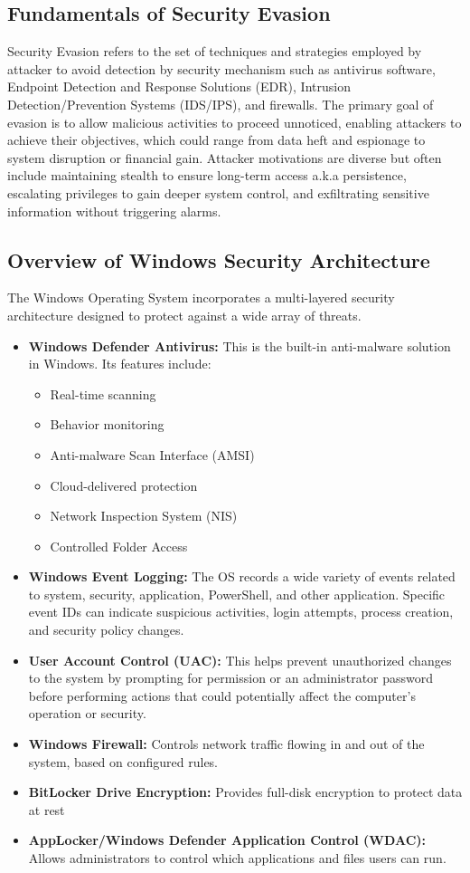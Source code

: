 \documentclass[11pt]{article}
\begin{document}
			\subsection{Fundamentals of Security Evasion}
			Security Evasion refers to the set of techniques and strategies employed by attacker to avoid detection by security mechanism such as antivirus software, Endpoint Detection and Response Solutions (EDR), Intrusion Detection/Prevention Systems (IDS/IPS), and firewalls. The primary goal of evasion is to allow malicious activities to proceed unnoticed, enabling attackers to achieve their objectives, which could range from data heft and espionage to system disruption or financial gain. Attacker motivations are diverse but often include maintaining stealth to ensure long-term access a.k.a persistence, escalating privileges to gain deeper system control, and exfiltrating sensitive information without triggering alarms.
			
			\subsection{Overview of Windows Security Architecture}
				The Windows Operating System incorporates a multi-layered security architecture designed to protect against a wide array of threats.
				\begin{itemize}
					\item \textbf{Windows Defender Antivirus:} This is the built-in anti-malware solution in Windows. Its features include:
						\begin{itemize}
							\item Real-time scanning
							\item Behavior monitoring
							\item Anti-malware Scan Interface (AMSI)
							\item Cloud-delivered protection
							\item Network Inspection System (NIS)
							\item Controlled Folder Access
						\end{itemize}
				\item \textbf{Windows Event Logging:} The OS records a wide variety of events related to system, security, application, PowerShell, and other application. Specific event IDs can indicate suspicious activities, login attempts, process creation, and security policy changes.
				\item \textbf{User Account Control (UAC):} This helps prevent unauthorized changes to the system by prompting for permission or an administrator password before performing actions that could potentially affect the computer's operation or security.
				\item \textbf{Windows Firewall:} Controls network traffic flowing in and out of the system, based on configured rules.
				\item \textbf{BitLocker Drive Encryption:} Provides full-disk encryption to protect data at rest
				\item  \textbf{AppLocker/Windows Defender Application Control (WDAC):} Allows administrators to control which applications and files users can run.
				\end{itemize}
				
\end{document}
